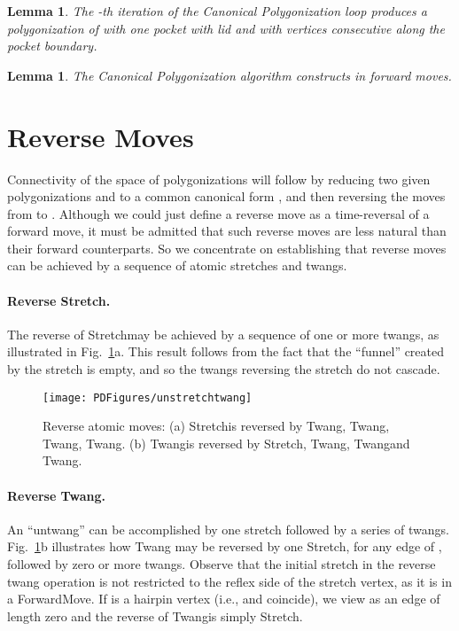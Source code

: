 \pdfoutput=1  \documentclass{article}
\def\st{{\sc Stretch}}
\def\tw{{\sc Twang}}
\def\fm{{\sc ForwardMove}}
\newtheorem{lemma}[theorem]{Lemma}
\newcommand{\lemlab}[1]{\label{lemma:#1}}
\newcommand{\figlab}[1]{\label{fig:#1}}
\newcommand{\seclab}[1]{\label{sec:#1}}
\newcommand{\figref}[1]{\ref{fig:#1}}
\begin{document}
\begin{lemma}
The -th iteration of the {\sc Canonical Polygonization} loop
produces a polygonization of  with one pocket with lid  and
with vertices  consecutive along the pocket
boundary. \lemlab{canonical.first}
\end{lemma}

\begin{lemma}
The {\sc Canonical Polygonization} algorithm constructs  in
 forward moves. \lemlab{canonical.final}
\end{lemma}


\vspace{-1.5em}
\section{Reverse Moves}
\seclab{Reverse}
Connectivity of the space of polygonizations will follow by reducing
two given polygonizations  and  to a common canonical form
, and then reversing the moves from  to .
Although we could just define a reverse move as a
time-reversal of a forward move, it must be admitted that such
reverse moves are less natural than their forward counterparts.  So
we concentrate on establishing that reverse moves can be achieved by
a sequence of atomic stretches and twangs.

\vspace{-0.5em}
\paragraph{Reverse Stretch.} The reverse of \st may be achieved by a
sequence of one or more twangs, as illustrated in
Fig.~\figref{unstretchtwang}a. This result follows from the fact
that the ``funnel'' created by the stretch is empty, and so the
twangs reversing the stretch do not cascade.


\begin{figure}[htbp]
\centering
\texttt{[image: PDFigures/unstretchtwang]}
\caption{Reverse atomic moves: (a) \st is reversed by
\tw, \tw, \tw, \tw. (b) \tw is
reversed by \st, \tw, \tw and \tw.}
\figlab{unstretchtwang}
\end{figure}





\vspace{-1.5em}
\paragraph{Reverse Twang.} An ``untwang'' can be accomplished by one stretch followed by a series
of twangs. Fig.~\figref{unstretchtwang}b illustrates how \tw
may be reversed by one \st, for any edge  of ,
followed by zero or more twangs. Observe that the initial stretch
in the reverse twang operation is not restricted to the reflex side of
the stretch vertex, as it is in a \fm. If  is
a hairpin vertex (i.e.,  and  coincide), we view  as an edge
of length zero and the reverse of \tw is simply \st.
\end{document}
